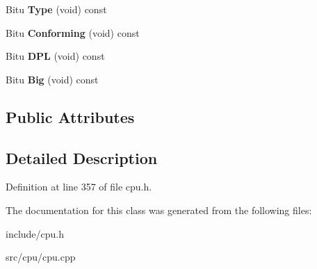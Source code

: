 \begin{DoxyCompactItemize}
\item 
\hypertarget{classDescriptor_a7c881ad7757005c45841a2d80d0ec368}{Bitu {\bfseries Type} (void) const }\label{classDescriptor_a7c881ad7757005c45841a2d80d0ec368}

\item 
\hypertarget{classDescriptor_afa0f36bc7446c8d1f861c74142ed5e78}{Bitu {\bfseries Conforming} (void) const }\label{classDescriptor_afa0f36bc7446c8d1f861c74142ed5e78}

\item 
\hypertarget{classDescriptor_a7b06a79d297d2632bd592f9464d3d2f6}{Bitu {\bfseries D\-P\-L} (void) const }\label{classDescriptor_a7b06a79d297d2632bd592f9464d3d2f6}

\item 
\hypertarget{classDescriptor_a13c26f622c45aaaedcfdbefe471b9e59}{Bitu {\bfseries Big} (void) const }\label{classDescriptor_a13c26f622c45aaaedcfdbefe471b9e59}

\end{DoxyCompactItemize}
\subsection*{Public Attributes}


\subsection{Detailed Description}


Definition at line 357 of file cpu.\-h.



The documentation for this class was generated from the following files\-:\begin{DoxyCompactItemize}
\item 
include/cpu.\-h\item 
src/cpu/cpu.\-cpp\end{DoxyCompactItemize}
